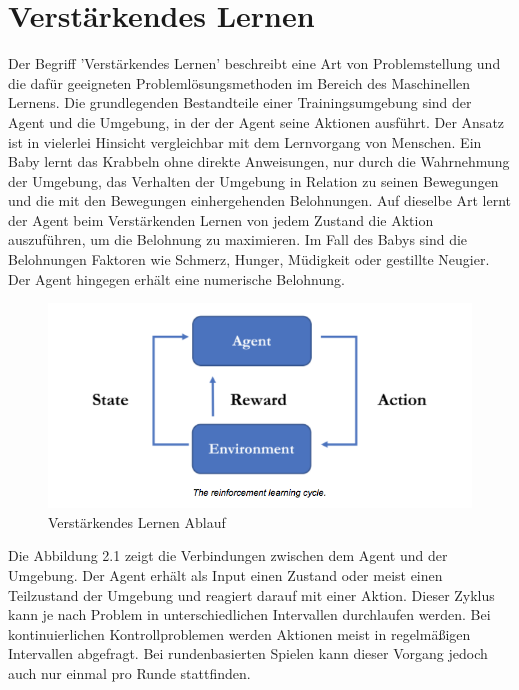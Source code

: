 {\chapter{Verstärkendes Lernen}}
\label{sec:rl}
Der Begriff 'Verstärkendes Lernen' beschreibt eine Art von Problemstellung und die dafür geeigneten Problemlösungsmethoden im Bereich des Maschinellen Lernens. Die grundlegenden Bestandteile einer Trainingsumgebung sind der Agent und die Umgebung, in der der Agent seine Aktionen ausführt. Der Ansatz ist in vielerlei Hinsicht vergleichbar mit dem Lernvorgang von Menschen. Ein Baby lernt das Krabbeln ohne direkte Anweisungen, nur durch die Wahrnehmung der Umgebung, das Verhalten der Umgebung in Relation zu seinen Bewegungen und die mit den Bewegungen einhergehenden Belohnungen. Auf dieselbe Art lernt der Agent beim Verstärkenden Lernen von jedem Zustand die Aktion auszuführen, um die Belohnung zu maximieren. Im Fall des Babys sind die Belohnungen Faktoren wie Schmerz, Hunger, Müdigkeit oder gestillte Neugier. Der Agent hingegen erhält eine numerische Belohnung.\cite{sutton2018reinforcement}

\begin{figure}[H]
  \centering  
  \includegraphics[scale=0.5]{img/rl_cycle.png}
  \caption{Verstärkendes Lernen Ablauf \protect\cite{unity_mlagents_rl_cycle}}
  \label{fig:rl_cycle}
\end{figure}

Die Abbildung 2.1 zeigt die Verbindungen zwischen dem Agent und der Umgebung. Der Agent erhält als Input einen Zustand oder meist einen Teilzustand der Umgebung und reagiert darauf mit einer Aktion. Dieser Zyklus kann je nach Problem in unterschiedlichen Intervallen durchlaufen werden. Bei kontinuierlichen Kontrollproblemen werden Aktionen meist in regelmäßigen Intervallen abgefragt. Bei rundenbasierten Spielen kann dieser Vorgang jedoch auch nur einmal pro Runde stattfinden.